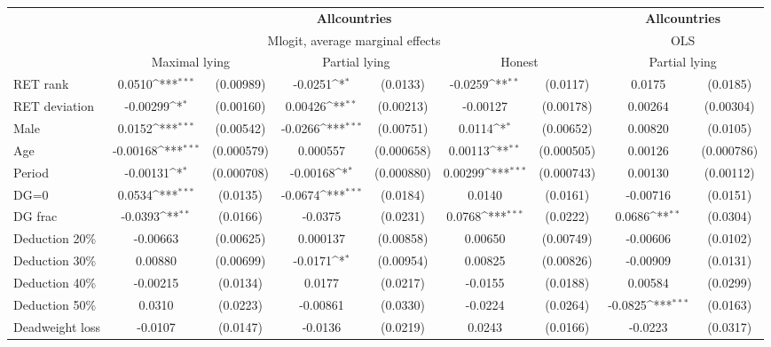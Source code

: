 \def\sym#1{\ifmmode^{#1}\else\(^{#1}\)\fi}
\begin{tabular}{l|cccccc|cc}
\hline\hline
&\multicolumn{6}{c|}{\bf All\space{}countries}&\multicolumn{2}{c}{\bf All\space{}countries}\\ &\multicolumn{6}{c|}{Mlogit, average marginal effects }&\multicolumn{2}{c}{OLS}\\
                &\multicolumn{2}{c}{Maximal lying}&\multicolumn{2}{c}{Partial lying}&\multicolumn{2}{c|}{Honest}  &\multicolumn{2}{c}{Partial lying}\\
\hline
RET rank        &   0.0510\sym{***}&(0.00989)&  -0.0251\sym{*}  & (0.0133)&  -0.0259\sym{**} & (0.0117)&   0.0175         & (0.0185)\\
RET deviation   & -0.00299\sym{*}  &(0.00160)&  0.00426\sym{**} &(0.00213)& -0.00127         &(0.00178)&  0.00264         &(0.00304)\\
Male            &   0.0152\sym{***}&(0.00542)&  -0.0266\sym{***}&(0.00751)&   0.0114\sym{*}  &(0.00652)&  0.00820         & (0.0105)\\
Age             & -0.00168\sym{***}&(0.000579)& 0.000557         &(0.000658)&  0.00113\sym{**} &(0.000505)&  0.00126         &(0.000786)\\
Period          & -0.00131\sym{*}  &(0.000708)& -0.00168\sym{*}  &(0.000880)&  0.00299\sym{***}&(0.000743)&  0.00130         &(0.00112)\\
DG=0          &   0.0534\sym{***}& (0.0135)&  -0.0674\sym{***}& (0.0184)&   0.0140         & (0.0161)& -0.00716         & (0.0151)\\
DG frac         &  -0.0393\sym{**} & (0.0166)&  -0.0375         & (0.0231)&   0.0768\sym{***}& (0.0222)&   0.0686\sym{**} & (0.0304)\\
Deduction 20\%& -0.00663         &(0.00625)& 0.000137         &(0.00858)&  0.00650         &(0.00749)& -0.00606         & (0.0102)\\
Deduction 30\%&  0.00880         &(0.00699)&  -0.0171\sym{*}  &(0.00954)&  0.00825         &(0.00826)& -0.00909         & (0.0131)\\
Deduction 40\%& -0.00215         & (0.0134)&   0.0177         & (0.0217)&  -0.0155         & (0.0188)&  0.00584         & (0.0299)\\
Deduction 50\%&   0.0310         & (0.0223)& -0.00861         & (0.0330)&  -0.0224         & (0.0264)&  -0.0825\sym{***}& (0.0163)\\
Deadweight loss&  -0.0107         & (0.0147)&  -0.0136         & (0.0219)&   0.0243         & (0.0166)&  -0.0223         & (0.0317)\\

\end{tabular}
